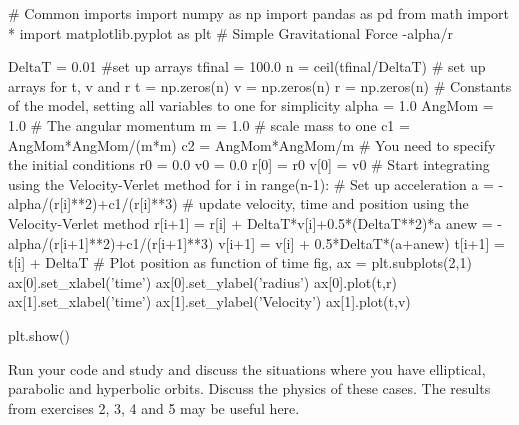 \documentclass[%
oneside,                 %
final,                   %
10pt]{article}
\begin{document}
\bpycode
# Common imports
import numpy as np
import pandas as pd
from math import *
import matplotlib.pyplot as plt
# Simple Gravitational Force   -alpha/r
    
DeltaT = 0.01
#set up arrays 
tfinal = 100.0
n = ceil(tfinal/DeltaT)
# set up arrays for t, v and r
t = np.zeros(n)
v = np.zeros(n)
r = np.zeros(n)
# Constants of the model, setting all variables to one for simplicity
alpha = 1.0
AngMom = 1.0  #  The angular momentum
m = 1.0  # scale mass to one
c1 = AngMom*AngMom/(m*m)
c2 = AngMom*AngMom/m
# You need to specify the initial conditions
r0 = 0.0
v0 = 0.0
r[0] = r0
v[0] = v0
# Start integrating using the Velocity-Verlet  method
for i in range(n-1):
    # Set up acceleration
    a = -alpha/(r[i]**2)+c1/(r[i]**3)
    # update velocity, time and position using the Velocity-Verlet method
    r[i+1] = r[i] + DeltaT*v[i]+0.5*(DeltaT**2)*a
    anew = -alpha/(r[i+1]**2)+c1/(r[i+1]**3)
    v[i+1] = v[i] + 0.5*DeltaT*(a+anew)
    t[i+1] = t[i] + DeltaT
    # Plot position as function of time
fig, ax = plt.subplots(2,1)
ax[0].set_xlabel('time')
ax[0].set_ylabel('radius')
ax[0].plot(t,r)
ax[1].set_xlabel('time')
ax[1].set_ylabel('Velocity')
ax[1].plot(t,v)

plt.show()

\epycode


Run your code and study and discuss the situations where you have elliptical, parabolic and hyperbolic orbits. Discuss the physics of these cases. The results from exercises 2, 3, 4 and 5 may be useful here. 



\end{document}

